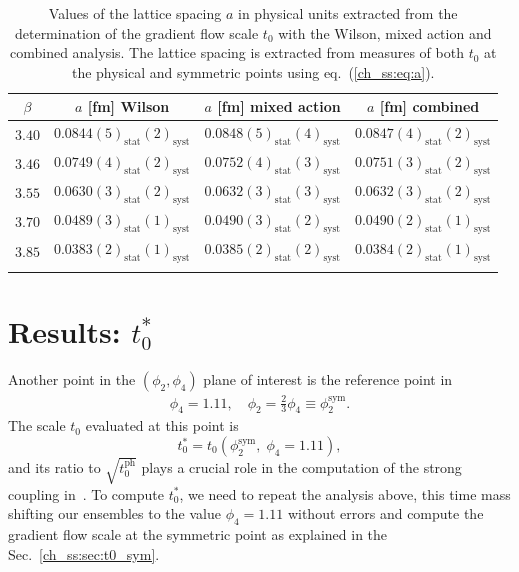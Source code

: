 {\begin{longtable}{c c c c}
\label{ch_ss:tab:a}
$\beta$ & $a$ [fm] Wilson & $a$ [fm] mixed action & $a$ [fm] combined \\
\toprule
$3.40$ & $0.0844(5)_{\textrm{stat}}(2)_{\textrm{syst}}$ & $0.0848(5)_{\textrm{stat}}(4)_{\textrm{syst}}$ & $0.0847(4)_{\textrm{stat}}(2)_{\textrm{syst}}$ \\
$3.46$ & $0.0749(4)_{\textrm{stat}}(2)_{\textrm{syst}}$ & $0.0752(4)_{\textrm{stat}}(3)_{\textrm{syst}}$ & $0.0751(3)_{\textrm{stat}}(2)_{\textrm{syst}}$ \\
$3.55$ & $0.0630(3)_{\textrm{stat}}(2)_{\textrm{syst}}$ & $0.0632(3)_{\textrm{stat}}(3)_{\textrm{syst}}$ & $0.0632(3)_{\textrm{stat}}(2)_{\textrm{syst}}$ \\
$3.70$ & $0.0489(3)_{\textrm{stat}}(1)_{\textrm{syst}}$ & $0.0490(3)_{\textrm{stat}}(2)_{\textrm{syst}}$ & $0.0490(2)_{\textrm{stat}}(1)_{\textrm{syst}}$ \\
$3.85$ & $0.0383(2)_{\textrm{stat}}(1)_{\textrm{syst}}$ & $0.0385(2)_{\textrm{stat}}(2)_{\textrm{syst}}$ & $0.0384(2)_{\textrm{stat}}(1)_{\textrm{syst}}$ \\
\bottomrule
\caption{Values of the lattice spacing $a$ in physical units extracted from the determination of the gradient flow scale $t_0$ with the Wilson, mixed action and combined analysis. The lattice spacing is extracted from measures of both $t_0$ at the physical and symmetric points using eq.~(\ref{ch_ss:eq:a}).}
\end{longtable}

\section{Results: $t_0^*$}

Another point in the $(\phi_2,\phi_4)$ plane of interest is the reference point in~\citep{Bruno:2016plf}
\begin{gather}
\phi_4=1.11, \quad \phi_2=\frac{2}{3}\phi_4\equiv\phi_2^{\textrm{sym}}.
\end{gather}
The scale $t_0$ evaluated at this point is
\begin{equation}
t_0^*=t_0\left(\phi_2^{\textrm{sym}},\;\phi_4=1.11\right),
\end{equation}
and its ratio to $\sqrt{t_0^{\textrm{ph}}}$ plays a crucial role in the computation of the strong coupling in~\citep{DallaBrida:2022eua}. To compute $t_0^{*}$, we need to repeat the analysis above, this time mass shifting our ensembles to the value $\phi_4=1.11$ without errors and compute the gradient flow scale at the symmetric point as explained in the Sec.~\ref{ch_ss:sec:t0_sym}.

}
